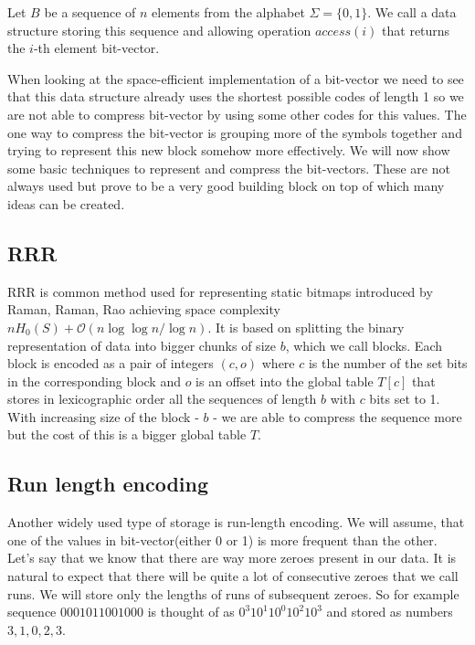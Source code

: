 \begin{definition}
Let $B$ be a sequence of $n$ elements from the alphabet $\Sigma = \{0, 1\}$. We call a data structure storing this sequence
and allowing operation $access(i)$ that returns the $i$-th element bit-vector.
\end{definition}

When looking at the space-efficient implementation of a bit-vector we need to see that this data structure already uses the shortest possible codes of length 1 so we are not able to compress bit-vector by using some other codes for this values. The one way to compress the bit-vector is grouping more of the symbols together and trying to represent this new block somehow more effectively. We will now show some basic techniques to represent and compress the bit-vectors. These are not always used but prove to be a very good building block on top of which many ideas can be created.

\subsection{RRR}

RRR is common method used for representing static bitmaps introduced by Raman, Raman, Rao \cite{raman2007succinct} achieving space complexity $nH_0(S) + \mathcal{O}(n \log \log n / \log n)$. It is based on splitting the binary representation of data into bigger chunks of size $b$, which we call blocks.
Each block is encoded as a pair of integers $(c, o)$ where $c$ is the number of the set bits in the corresponding block and $o$ is an offset into the global table $T[c]$ that stores in lexicographic order all the sequences of
length $b$ with $c$ bits set to 1. With increasing size of the block - $b$ - we are able to compress the sequence more but the cost of this is a bigger global table $T$.

\subsection{Run length encoding}

Another widely used type of storage is run-length encoding. We will assume, that one of the values in bit-vector(either 0 or 1) is more frequent than the other. Let's say that we know that there are way more zeroes present in our data. It is natural to expect that there will be quite a lot of consecutive zeroes that we call runs. We will store only the lengths of runs of subsequent zeroes. So for example
sequence $0001011001000$ is thought of as $0^{3}10^{1}10^{0}10^{2}10^{3}$ and stored as numbers $3, 1, 0, 2, 3$.

